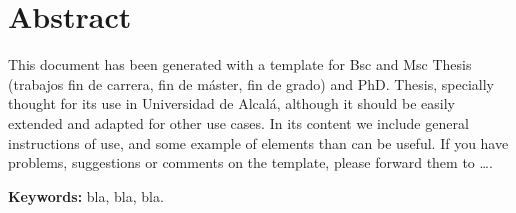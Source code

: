 
\chapter*{Abstract}
\label{cha:abstract}

This document has been generated with a template for Bsc and Msc Thesis
(trabajos fin de carrera, fin de máster, fin de grado) and PhD. Thesis,
specially thought for its use in Universidad de Alcalá, although it
should be easily extended and adapted for other use cases. In its
content we include general instructions of use, and some example of
elements than can be useful. If you have problems, suggestions or
comments on the template, please forward them to \ldots.

\textbf{Keywords:} bla, bla, bla.